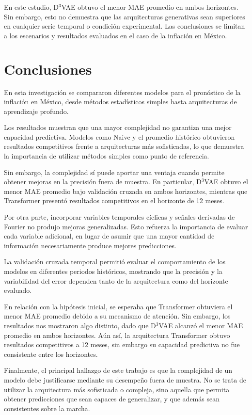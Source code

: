 \documentclass[12pt,letterpaper]{article}
\begin{document}
En este estudio, D$^3$VAE obtuvo el menor MAE
promedio en ambos horizontes. Sin embargo,
esto no demuestra que las arquitecturas
generativas sean superiores en cualquier
serie temporal o condición experimental.
Las conclusiones se limitan a los escenarios
y resultados evaluados en el caso de la inflación en México.

\section{Conclusiones}

En esta investigación se compararon diferentes
modelos para el pronóstico de la inflación en México,
desde métodos estadísticos simples hasta
arquitecturas de aprendizaje profundo.

Los resultados muestran que una mayor complejidad
no garantiza una mejor capacidad predictiva.
Modelos como Naive y el promedio histórico
obtuvieron resultados competitivos frente a
arquitecturas más sofisticadas, lo que demuestra
la importancia de utilizar métodos simples
como punto de referencia.

Sin embargo, la complejidad sí puede aportar
una ventaja cuando permite obtener mejoras
en la precisión fuera de muestra. En particular,
D$^3$VAE obtuvo el menor MAE promedio bajo
validación cruzada en ambos horizontes, mientras
que Transformer presentó resultados competitivos
en el horizonte de 12 meses.

Por otra parte, incorporar variables temporales
cíclicas y señales derivadas de Fourier no produjo
mejoras generalizadas. Esto refuerza la importancia
de evaluar cada variable adicional, en lugar
de asumir que una mayor cantidad de información
necesariamente produce mejores predicciones.

La validación cruzada temporal permitió evaluar
el comportamiento de los modelos en diferentes
periodos históricos, mostrando que la precisión
y la variabilidad del error dependen tanto
de la arquitectura como del horizonte evaluado.

En relación con la hipótesis inicial, se esperaba
que Transformer obtuviera el menor MAE promedio debido a su mecanismo de atención. Sin embargo, 
los resultados nos mostraron algo distinto,
dado que D$^3$VAE alcanzó el menor MAE promedio
en ambos horizontes. Aún así, la arquitectura Transformer obtuvo resultados competitivos a 12 meses, sin embargo su capacidad predictiva no fue consistente entre los horizontes.

Finalmente, el principal hallazgo de este trabajo
es que la complejidad de un modelo debe justificarse
mediante su desempeño fuera de muestra.
No se trata de utilizar la arquitectura más
sofisticada o compleja, sino aquella que permita obtener predicciones que sean capaces de generalizar, y que además sean consistentes sobre la marcha.
\end{document}
